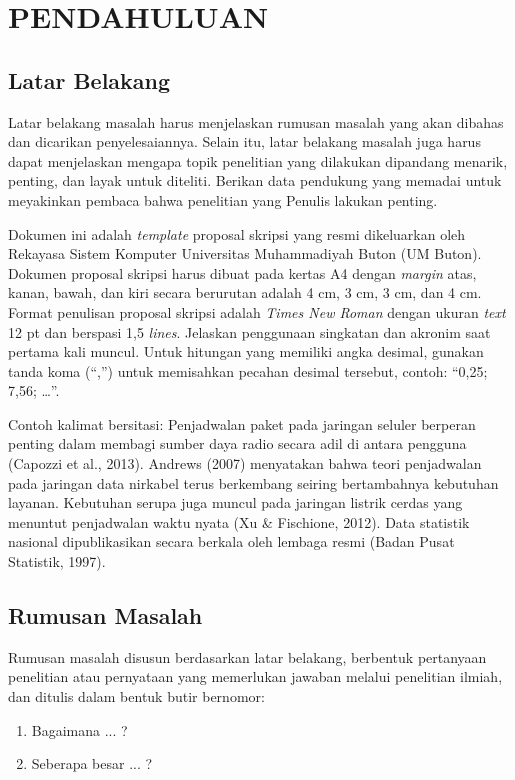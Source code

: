\chapter{PENDAHULUAN}

\section{Latar Belakang}
Latar belakang masalah harus menjelaskan rumusan masalah yang akan dibahas dan dicarikan penyelesaiannya. Selain itu, latar belakang masalah juga harus dapat menjelaskan mengapa topik penelitian yang dilakukan dipandang menarik, penting, dan layak untuk diteliti. Berikan data pendukung yang memadai untuk meyakinkan pembaca bahwa penelitian yang Penulis lakukan penting.

Dokumen ini adalah \textit{template} proposal skripsi yang resmi dikeluarkan oleh Rekayasa Sistem Komputer Universitas Muhammadiyah Buton (UM Buton). Dokumen proposal skripsi harus dibuat pada kertas A4 dengan \textit{margin} atas, kanan, bawah, dan kiri secara berurutan adalah 4 cm, 3 cm, 3 cm, dan 4 cm. Format penulisan proposal skripsi adalah \textit{Times New Roman} dengan ukuran \textit{text} 12 pt dan berspasi 1,5 \textit{lines}. Jelaskan penggunaan singkatan dan akronim saat pertama kali muncul. Untuk hitungan yang memiliki angka desimal, gunakan tanda koma (“,”) untuk memisahkan pecahan desimal tersebut, contoh: “0,25; 7,56; …”.

Contoh kalimat bersitasi: Penjadwalan paket pada jaringan seluler berperan penting dalam membagi sumber daya radio secara adil di antara pengguna (Capozzi et al., 2013). Andrews (2007) menyatakan bahwa teori penjadwalan pada jaringan data nirkabel terus berkembang seiring bertambahnya kebutuhan layanan. Kebutuhan serupa juga muncul pada jaringan listrik cerdas yang menuntut penjadwalan waktu nyata (Xu \& Fischione, 2012). Data statistik nasional dipublikasikan secara berkala oleh lembaga resmi (Badan Pusat Statistik, 1997).

\section{Rumusan Masalah}
Rumusan masalah disusun berdasarkan latar belakang, berbentuk pertanyaan penelitian atau pernyataan yang memerlukan jawaban melalui penelitian ilmiah, dan ditulis dalam bentuk butir bernomor:
\begin{enumerate}
\item Bagaimana ... ?
\item Seberapa besar ... ?
\end{enumerate}

